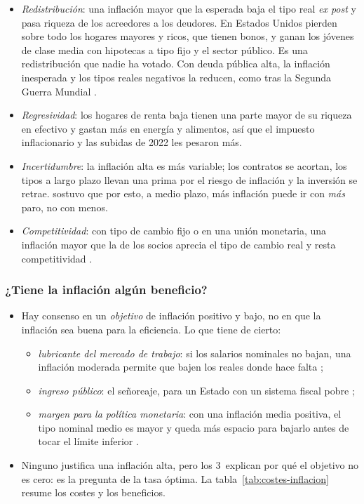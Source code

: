 \documentclass[11pt]{article}
\begin{document}
\begin{itemize}
\item \emph{Redistribución}: una inflación mayor que la esperada baja el tipo real \emph{ex post} y pasa riqueza de los acreedores a los deudores. En Estados Unidos pierden sobre todo los hogares mayores y ricos, que tienen bonos, y ganan los jóvenes de clase media con hipotecas a tipo fijo y el sector público\nocite{DoepkeSchneider2006Inflation}. Es una redistribución que nadie ha votado. Con deuda pública alta, la inflación inesperada y los tipos reales negativos la reducen, como tras la Segunda Guerra Mundial\nocite{ReinhartSbrancia2015Liquidation} .
\item \emph{Regresividad}: los hogares de renta baja tienen una parte mayor de su riqueza en efectivo y gastan más en energía y alimentos, así que el impuesto inflacionario y las subidas de 2022 les pesaron más\nocite{BCE2022RentaBaja}.
\item \emph{Incertidumbre}: la inflación alta es más variable; los contratos se acortan, los tipos a largo plazo llevan una prima por el riesgo de inflación y la inversión se retrae. \textcite{Friedman1977Nobel} sostuvo que por esto, a medio plazo, más inflación puede ir con \emph{más} paro, no con menos.
\item \emph{Competitividad}: con tipo de cambio fijo o en una unión monetaria, una inflación mayor que la de los socios aprecia el tipo de cambio real y resta competitividad .
\end{itemize}

\subsubsection{¿Tiene la inflación algún beneficio?}\label{sec:beneficios}

\begin{itemize}
\item Hay consenso en un \emph{objetivo} de inflación positivo y bajo, no en que la inflación sea buena para la eficiencia. Lo que tiene de cierto:
  \begin{itemize}
  \item \emph{lubricante del mercado de trabajo}: si los salarios nominales no bajan, una inflación moderada permite que bajen los reales donde hace falta\nocite{Tobin1972Inflation,AkerlofDickensPerry1996} ;
  \item \emph{ingreso público}: el señoreaje, para un Estado con un sistema fiscal pobre\nocite{Phelps1973Inflation} ;
  \item \emph{margen para la política monetaria}: con una inflación media positiva, el tipo nominal medio es mayor y queda más espacio para bajarlo antes de tocar el límite inferior .
  \end{itemize}
\item Ninguno justifica una inflación alta, pero los 3~explican por qué el objetivo no es cero: es la pregunta de la tasa óptima. La tabla~\ref{tab:costes-inflacion} resume los costes y los beneficios.
\end{itemize}
\end{document}
